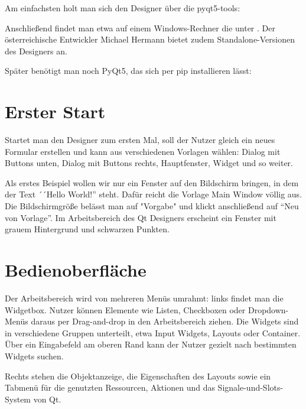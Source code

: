 Am einfachsten holt man sich den Designer über die pyqt5-tools:

\medskip


\medskip

Anschließend findet man etwa auf einem Windows-Rechner die  unter . Der österreichische Entwickler Michael Hermann bietet zudem Standalone-Versionen des Designers  an.

Später benötigt man noch PyQt5, das sich per pip installieren lässt:

\medskip


\section{Erster Start}

Startet man den Designer zum ersten Mal, soll der Nutzer gleich ein neues Formular erstellen und kann aus verschiedenen Vorlagen wählen: Dialog mit Buttons unten, Dialog mit Buttons rechts, Hauptfenster, Widget und so weiter.

Als erstes Beispiel wollen wir nur ein Fenster auf den Bildschirm bringen, in dem der Text ´´Hello World!'' steht. Dafür reicht die Vorlage Main Window völlig aus. Die Bildschirmgröße belässt man auf "Vorgabe" und klickt anschließend auf ``Neu von Vorlage''. Im Arbeitsbereich des Qt Designers erscheint ein Fenster mit grauem Hintergrund und schwarzen Punkten.

\section{Bedienoberfläche}

Der Arbeitsbereich wird von mehreren Menüs umrahmt: links findet man die Widgetbox. Nutzer können Elemente wie Listen, Checkboxen oder Dropdown-Menüs daraus per Drag-and-drop in den Arbeitsbereich ziehen. Die Widgets sind in verschiedene Gruppen unterteilt, etwa Input Widgets, Layouts oder Container. Über ein Eingabefeld am oberen Rand kann der Nutzer gezielt nach bestimmten Widgets suchen.

Rechts stehen die Objektanzeige, die Eigenschaften des Layouts sowie ein Tabmenü für die genutzten Ressourcen, Aktionen und das Signale-und-Slots-System von Qt.

